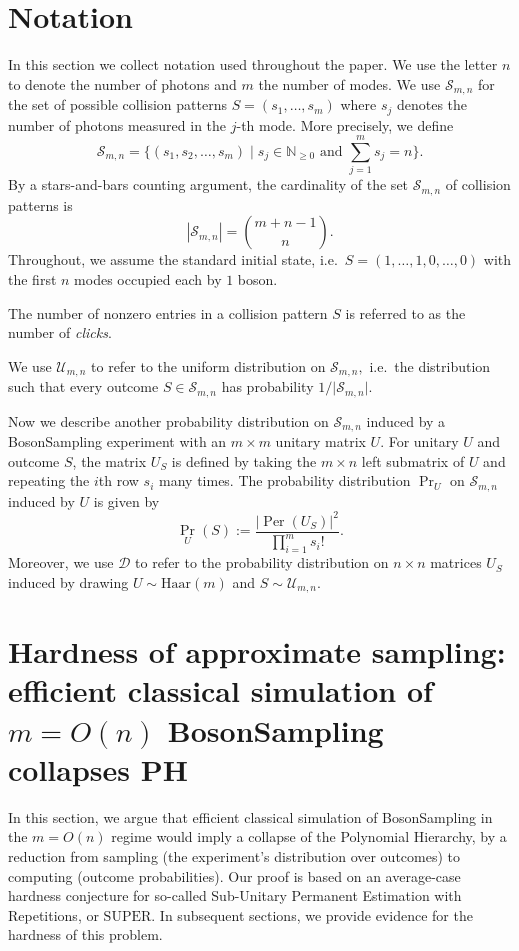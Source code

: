 \documentclass[11pt]{article}
\theoremstyle{plain}
\theoremstyle{plain}
\theoremstyle{plain}
\theoremstyle{plain}
\theoremstyle{plain}
\theoremstyle{plain}
\theoremstyle{plain}
\theoremstyle{remark}
\theoremstyle{remark}
\theoremstyle{plain}
\theoremstyle{plain}
\theoremstyle{plain}
\theoremstyle{plain}
\newcommand{\Per}{\operatorname{Per}}
\newcommand{\Haar}{\mathrm{Haar}}
\newcommand{\Smn}{\mathcal{S}_{m,n}}
\begin{document}
\section{Notation} 
In this section we collect notation used throughout the paper.
We use the letter $n$ to denote the number of photons and $m$ the number of modes.  
We use $\mathcal S_{m,n}$ for the set of possible collision patterns $S=(s_1,\ldots,s_m)$ where $s_j$ denotes the number of photons measured in the $j$-th mode.  More precisely, we define
\[
\mathcal{S}_{m,n}
= 
\{(s_1,s_2,\ldots,s_m) \mid  s_j\in\mathbb N_{\geq 0} \text{ and } \sum_{j=1}^m s_j = n\}.
\]
By a stars-and-bars counting argument, the cardinality of the set
$\mathcal{S}_{m,n}$ of collision patterns is
\[
|\mathcal{S}_{m,n}| = \binom{m+n-1}{n}.
\]
Throughout, we assume the standard initial state, i.e.\ $S=(1,\ldots,1,0,\ldots,0)$ with the first $n$ modes occupied each by $1$ boson.

The number of nonzero entries in a collision pattern $S$ is referred to as the number of \textit{clicks}.  

We use $\mathcal{U}_{m,n}$ to refer to the uniform distribution on $\mathcal{S}_{m,n},$ i.e.\ the distribution such that every outcome $S\in\mathcal{S}_{m,n}$ has probability $1/\vert\Smn\vert.$

Now we describe another probability distribution on $\mathcal{S}_{m,n}$ induced
by a BosonSampling experiment with an $m\times m$ unitary matrix $U$.
For unitary $U$ and outcome $S$, the matrix $U_S$ is defined by taking the $m \times n$ left submatrix of $U$ and repeating the $i$th row $s_i$ many times. The probability distribution $\Pr_U$ on $\mathcal{S}_{m,n}$ induced 
by $U$ is given by
\begin{equation} \label{eq:probability}
    \Pr_U(S) := \frac{\left|\Per(U_S)\right|^2}{\prod_{i=1}^m s_i!}.
\end{equation}
Moreover, we use $\mathcal{D}$ to refer to the probability distribution on $n\times n$ matrices $U_S$ induced by drawing $U\sim \Haar(m)$ and $S\sim\mathcal U_{m,n}.$ 

\section{Hardness of approximate sampling: efficient classical simulation of $m=O(n)$ BosonSampling collapses \textsf{PH}}\label{sec:classical-hardness}

In this section, we argue that efficient classical simulation of BosonSampling in the $m=O(n)$ regime would imply a collapse of the Polynomial Hierarchy, by a reduction from sampling (the experiment's distribution over outcomes) to computing (outcome probabilities). 
Our proof is based on an average-case hardness conjecture for so-called Sub-Unitary Permanent Estimation with Repetitions, or $\mathrm{SUPER}.$
In subsequent sections, we provide evidence for the hardness of this problem. 
\end{document}
